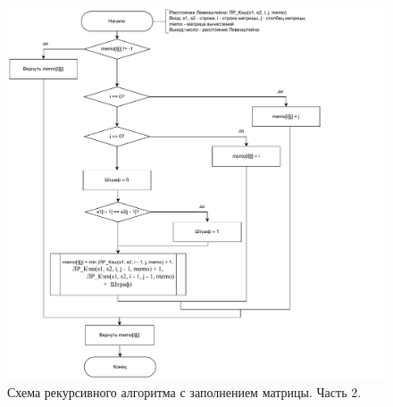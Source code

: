 \begin{figure}[H]
    \centering
    \includegraphics[width=185mm]{images/l_recursive_cache_part2}
    \caption{Схема рекурсивного алгоритма с заполнением матрицы. Часть 2.}
    \label{images:l_recursive_cache_part2}
\end{figure}

